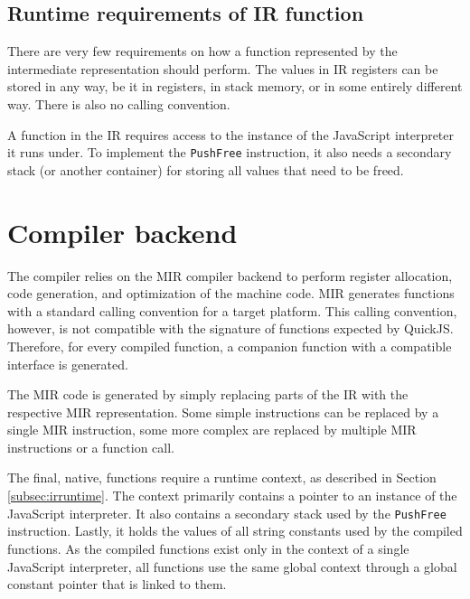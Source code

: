 
\subsection{Runtime requirements of IR function}\label{subsec:irruntime}

There are very few requirements on how a function represented by the intermediate representation should perform. The values in IR registers can be stored in any way, be it in registers, in stack memory, or in some entirely different way. There is also no calling convention.

A function in the IR requires access to the instance of the JavaScript interpreter it runs under. To implement the \texttt{PushFree} instruction, it also needs a secondary stack (or another container) for storing all values that need to be freed.


\section{Compiler backend}

The compiler relies on the MIR compiler backend to perform register allocation, code generation, and optimization of the machine code. MIR generates functions with a standard calling convention for a target platform. This calling convention, however, is not compatible with the signature of functions expected by QuickJS. Therefore, for every compiled function, a companion function with a compatible interface is generated.

The MIR code is generated by simply replacing parts of the IR with the respective MIR representation. Some simple instructions can be replaced by a single MIR instruction, some more complex are replaced by multiple MIR instructions or a function call.

The final, native, functions require a runtime context, as described in Section \ref{subsec:irruntime}. The context primarily contains a pointer to an instance of the JavaScript interpreter. It also contains a secondary stack used by the \texttt{PushFree} instruction. Lastly, it holds the values of all string constants used by the compiled functions. As the compiled functions exist only in the context of a single JavaScript interpreter, all functions use the same global context through a global constant pointer that is linked to them.



